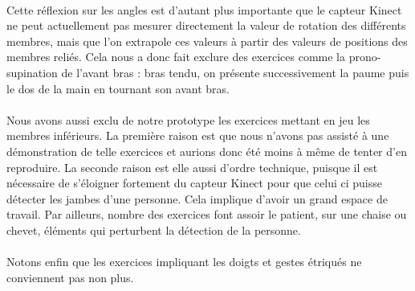 \paragraph{}
Cette réflexion sur les angles est d'autant plus importante que le capteur Kinect ne peut actuellement pas mesurer directement
la valeur de rotation des différents membres, mais que l'on extrapole ces valeurs à partir des valeurs de positions des membres
reliés. Cela nous a donc fait exclure des exercices comme la prono-supination de l'avant bras : bras tendu, on présente successivement la paume puis le dos de la main en tournant son avant bras.

\paragraph{}
Nous avons aussi exclu de notre prototype les exercices mettant en jeu les membres inférieurs. La première raison est que nous n'avons pas assisté à une démonstration de telle exercices et aurions donc été moins à même de tenter d'en reproduire. La 
seconde raison est elle aussi d'ordre technique, puisque il est nécessaire de s'éloigner fortement du capteur Kinect pour que 
celui ci puisse détecter les jambes d'une personne. Cela implique d'avoir un grand espace de travail. Par ailleurs, nombre 
des exercices font assoir le patient, sur une chaise ou chevet, éléments qui perturbent la détection de la personne.

\paragraph{}
Notons enfin que les exercices impliquant les doigts et gestes étriqués ne conviennent pas non plus.